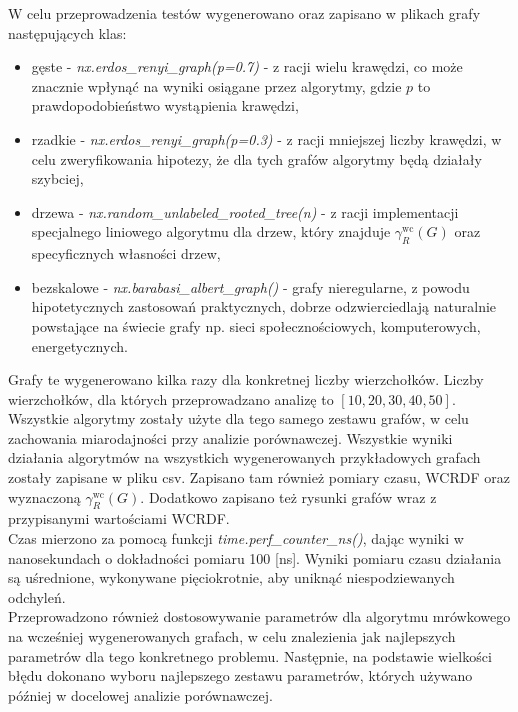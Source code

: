 W celu przeprowadzenia testów wygenerowano oraz zapisano w plikach grafy następujących klas: 
\begin{itemize}
    \item gęste - \textit{nx.erdos\_renyi\_graph(p=0.7)} - z racji wielu krawędzi, co może znacznie wpłynąć na wyniki osiągane przez algorytmy, gdzie $p$ to prawdopodobieństwo wystąpienia krawędzi,
    \item rzadkie - \textit{nx.erdos\_renyi\_graph(p=0.3)} - z racji mniejszej liczby krawędzi, w celu zweryfikowania hipotezy, że dla tych grafów algorytmy będą działały szybciej,
    \item drzewa - \textit{nx.random\_unlabeled\_rooted\_tree(n)} - z racji implementacji specjalnego liniowego algorytmu dla drzew, który znajduje $\gamma_{R}^{\text{wc}}(G)$ oraz specyficznych własności drzew,
    \item bezskalowe - \textit{nx.barabasi\_albert\_graph()} - grafy nieregularne, z powodu hipotetycznych zastosowań praktycznych, dobrze odzwierciedlają naturalnie powstające na świecie grafy np. sieci społecznościowych, komputerowych, energetycznych.
\end{itemize}

Grafy te wygenerowano kilka razy dla konkretnej liczby wierzchołków. Liczby wierzchołków, dla których przeprowadzano analizę to $[10, 20, 30, 40, 50]$. Wszystkie algorytmy zostały użyte dla tego samego zestawu grafów, w celu zachowania miarodajności przy analizie porównawczej. Wszystkie wyniki działania algorytmów na wszystkich wygenerowanych przykładowych grafach zostały zapisane w pliku csv. Zapisano tam również pomiary czasu, WCRDF oraz wyznaczoną $\gamma_{R}^{\text{wc}}(G)$. Dodatkowo zapisano też rysunki grafów wraz z przypisanymi wartościami WCRDF.\\

Czas mierzono za pomocą funkcji \textit{time.perf\_counter\_ns()}, dając wyniki w nanosekundach o dokładności pomiaru 100 [ns]. Wyniki pomiaru czasu działania są uśrednione, wykonywane pięciokrotnie, aby uniknąć niespodziewanych odchyleń.\\

Przeprowadzono również dostosowywanie parametrów dla algorytmu mrówkowego na wcześniej wygenerowanych grafach, w celu znalezienia jak najlepszych parametrów dla tego konkretnego problemu. Następnie, na podstawie wielkości błędu dokonano wyboru najlepszego zestawu parametrów, których używano później w docelowej analizie porównawczej.\\

